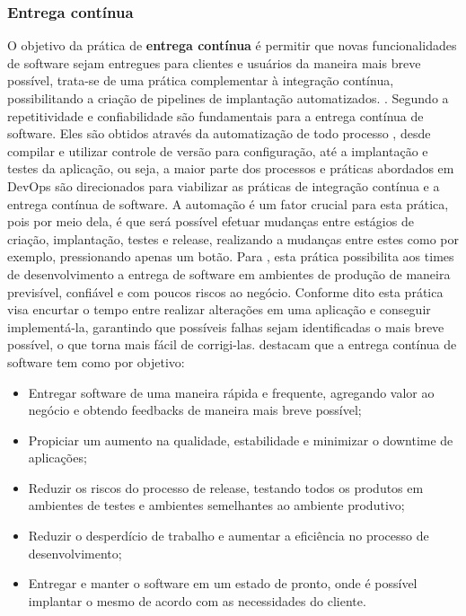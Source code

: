 \documentclass[twoside,english,brazilian]{UNISINOSartigo}
\begin{document}
\subsubsection{Entrega contínua}
O objetivo da prática de \textbf{entrega contínua} é permitir que novas funcionalidades de software sejam entregues para clientes e usuários da maneira mais breve possível, trata-se de uma prática complementar à integração contínua, possibilitando a criação de pipelines de implantação automatizados. \cite{Sharma2014}. \newline
Segundo  a repetitividade e confiabilidade são fundamentais para a entrega contínua de software. Eles são obtidos através da automatização de todo processo , desde compilar e utilizar controle de versão para configuração, até a implantação e testes da aplicação, ou seja, a maior parte dos processos e práticas abordados em DevOps são direcionados para viabilizar as práticas de integração contínua e a entrega contínua de software. A automação é um fator crucial para esta prática, pois por meio dela, é que será possível efetuar mudanças entre estágios de criação, implantação, testes e release, realizando a mudanças entre estes como por exemplo, pressionando apenas um botão. 
Para , esta prática possibilita aos times de desenvolvimento a entrega de software em ambientes de produção de maneira previsível, confiável e com poucos riscos ao negócio. Conforme dito esta prática visa encurtar o tempo entre realizar alterações em uma aplicação e conseguir implementá-la, garantindo que possíveis falhas sejam identificadas o mais breve possível, o que torna mais fácil de corrigi-las. \newline
{} destacam que a entrega contínua de software tem como por objetivo:
\begin{itemize}
\item Entregar software de uma maneira rápida e frequente, agregando valor ao negócio e obtendo feedbacks de maneira mais breve possível;
\item Propiciar um aumento na qualidade, estabilidade  e minimizar o downtime de aplicações;
\item Reduzir os riscos do processo de release, testando todos os produtos em ambientes de testes e ambientes semelhantes ao ambiente produtivo;
\item Reduzir o desperdício de trabalho e aumentar a eficiência no processo de desenvolvimento;
\item Entregar e manter o software em um estado de pronto, onde é possível implantar o mesmo de acordo com as necessidades do cliente.
\end{itemize}
\end{document}
